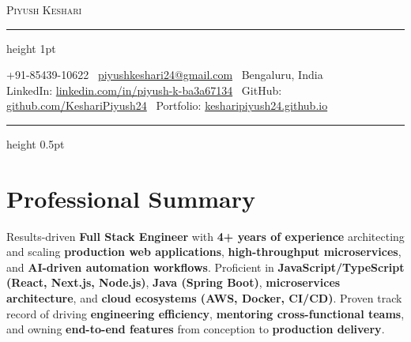 \documentclass[letterpaper,10pt]{article}
\begin{document}
\begin{center}
    {\huge \scshape \color{primarycolor} Piyush Keshari} \\ \vspace{2pt}
    {\color{accentcolor} \hrule height 1pt} \vspace{2pt}
    \small +91-85439-10622 \textbar\ \href{mailto:piyushkeshari24@gmail.com}{piyushkeshari24@gmail.com} \textbar\ Bengaluru, India \\
    LinkedIn: \href{https://linkedin.com/in/piyush-k-ba3a67134}{linkedin.com/in/piyush-k-ba3a67134} \textbar\
    GitHub: \href{https://github.com/KeshariPiyush24}{github.com/KeshariPiyush24} \textbar\
    Portfolio: \href{https://kesharipiyush24.github.io/}{kesharipiyush24.github.io} \\
    \vspace{2pt}
    {\color{accentcolor} \hrule height 0.5pt}
    \vspace{-4pt}
\end{center}

\section{Professional Summary}
\small{
Results-driven \textbf{Full Stack Engineer} with \textbf{4+ years of experience} architecting and scaling \textbf{production web applications}, \textbf{high-throughput microservices}, and \textbf{AI-driven automation workflows}. Proficient in \textbf{JavaScript/TypeScript (React, Next.js, Node.js)}, \textbf{Java (Spring Boot)}, \textbf{microservices architecture}, and \textbf{cloud ecosystems (AWS, Docker, CI/CD)}. Proven track record of driving \textbf{engineering efficiency}, \textbf{mentoring cross-functional teams}, and owning \textbf{end-to-end features} from conception to \textbf{production delivery}.
}
\vspace{1pt}

\end{document}
